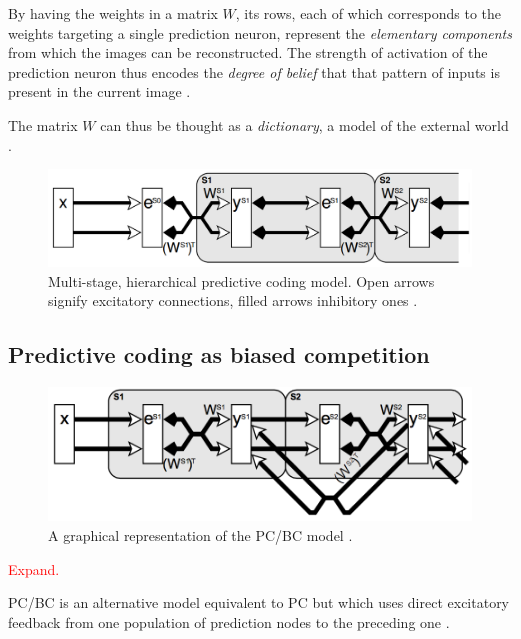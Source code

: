 \documentclass[11pt,a4paper]{report}
\begin{document}
				By having the weights in a matrix $W$, its rows, each of which corresponds to the weights targeting a single prediction neuron, represent the \emph{elementary components} from which the images can be reconstructed. The strength of activation of the prediction neuron thus encodes the \emph{degree of belief} that that pattern of inputs is present in the current image \cite{spratling2014predictive}.
				
				The matrix $W$ can thus be thought as a \emph{dictionary}, a model of the external world \cite{spratling2012unsupervised,spratling2014predictive}.

				\begin{figure}[h]
					\centering
					\includegraphics[width=\textwidth]{pc}
					\caption{Multi-stage, hierarchical predictive coding model. Open arrows signify excitatory connections, filled arrows inhibitory ones \cite{spratling2008reconciling}.}
					\label{fig:pcbc}
				\end{figure}

			\subsection{Predictive coding as biased competition}
				\begin{figure}[h]
					\centering
					\includegraphics[width=\textwidth]{pcbc}
					\caption{A graphical representation of the PC/BC model \cite{spratling2008predictive}.}
					\label{fig:pcbc}
				\end{figure}
				
				\textcolor{red}{Expand.}
				
				PC/BC is an alternative model equivalent to PC but which uses direct excitatory feedback from one population of prediction nodes to the preceding one \cite{spratling2008predictive}.
				
\end{document}
